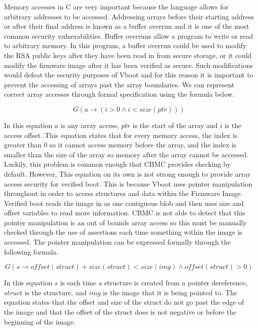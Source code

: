 \documentclass[../report.tex]{subfiles}
\begin{document}
Memory accesses in C are very important because the language allows for arbitrary addresses to be accessed. 
Addressing arrays before their starting address or after their final address is known as a buffer overrun and it is one of the most common security vulnerabilities. 
Buffer overruns allow a program to write or read to arbitrary memory. 
In this program, a buffer overrun could be used to modify the RSA public keys after they have been read in from secure storage, or it could modify the firmware image after it has been verified as secure. 
Such modifications would defeat the security purposes of Vboot and for this reason it is important to prevent the accessing of arrays past the array boundaries.
We can represent correct array accesses through formal specification using the formula below.

\begin{equation}
    G(a \to (i > 0 \land i < size(ptr)))
\end{equation}

In this equation $a$ is any array access, $ptr$ is the start of the array and $i$ is the access offset.
This equation states that for every memory access, the index is greater than 0 so it cannot access memory before the array,  and the index is smaller than the size of the array so memory after the array cannot be accessed.
Luckily, this problem is common enough that CBMC provides checking by default.
However, This equation on its own is not strong enough to provide array access security for verified boot. 
This is because Vboot uses pointer manipulation throughout in order to access structures and data within the Firmware Image. 
Verified boot reads the image in as one contiguous blob and then uses size and offset variables to read more information.
CBMC is not able to detect that this pointer manipulation is an out of bounds array access so this must be manually checked through the use of assertions each time something within the image is accessed.
The pointer manipulation can be expressed formally through the following formula.

\begin{equation}
    G(s \to offset(struct) + size(struct) < size(img) \land offset(struct) > 0)
\end{equation}

In this equation $s$ is each time a structure is created from a pointer dereference, $struct$ is the structure, and $img$ is the image that it is being pointed to.
The equation states that the offset and size of the struct do not go past the edge of the image and that the offset of the struct does is not negative or before the beginning of the image.
\end{document}
